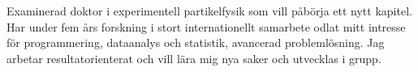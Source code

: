 

\begin{cvparagraph}

Examinerad doktor i experimentell partikelfysik som vill påbörja ett nytt kapitel. %
Har under fem års forskning i stort internationellt samarbete odlat mitt intresse för programmering, dataanalys och statistik, avancerad problemlösning. 
Jag arbetar resultatorienterat och vill lära mig nya saker och utvecklas i grupp. %
\end{cvparagraph}
